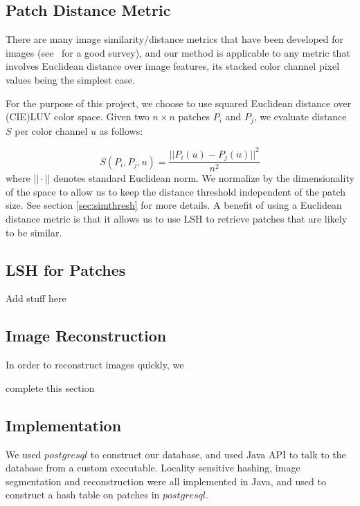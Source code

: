 
\subsection{Patch Distance Metric}\label{sec:sim}
There are many image similarity/distance metrics that have been developed for
images (see~\cite{yasmin2013use} for a good survey), and
our method is applicable to any metric that involves Euclidean
distance over image features, its stacked color channel pixel values
being the simplest case.

For the purpose of this project, we choose to use squared Euclidean
distance over (CIE)LUV color space.
Given two $n \times n$ patches $P_i$ and $P_j$, we evaluate distance $S$
per color channel $u$ as follows:

\begin{displaymath}
S(P_i, P_j, u) = \frac{||P_i(u) - P_j(u)||^2}{n^2}
\end{displaymath}
where $||\cdot||$ denotes standard Euclidean norm.
We normalize by the dimensionality of the space to allow us to keep the
distance threshold independent of the patch size. See section \ref{sec:simthresh} for more details.  A benefit of using a Euclidean distance metric is that it allows us to use LSH to retrieve patches that are likely to be similar.

\subsection{LSH for Patches}\label{sec:lsh}
\begin{edit}
Add stuff here
\end{edit}

\subsection{Image Reconstruction}\label{sec:reconst}

In order to reconstruct images quickly, we
\begin{edit}
complete this section
\end{edit}

\subsection{Implementation}\label{sec:impl}
We used $postgresql$ to construct our database, and used
Java API to talk to the database from a custom executable. Locality
sensitive hashing, image segmentation and reconstruction were
all implemented in Java, and used to construct a hash table
on patches in $postgresql$.

